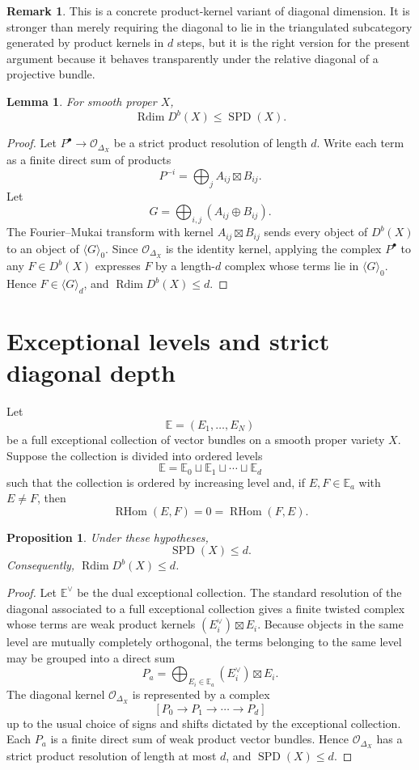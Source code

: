 \documentclass[11pt]{amsart}
\numberwithin{equation}{section}
\newtheorem{proposition}[theorem]{Proposition}
\newtheorem{lemma}[theorem]{Lemma}
\theoremstyle{definition}
\newtheorem{remark}[theorem]{Remark}
\DeclareMathOperator{\Rdim}{Rdim}
\DeclareMathOperator{\RHom}{RHom}
\DeclareMathOperator{\SPD}{SPD}
\begin{document}
\begin{remark}
This is a concrete product-kernel variant of diagonal dimension. It is stronger than merely requiring the diagonal to lie in the triangulated subcategory generated by product kernels in $d$ steps, but it is the right version for the present argument because it behaves transparently under the relative diagonal of a projective bundle.
\end{remark}

\begin{lemma}
For smooth proper $X$,
\[
\Rdim D^b(X)\le \SPD(X).
\]
\end{lemma}

\begin{proof}
Let $P^\bullet\to \mathcal O_{\Delta_X}$ be a strict product resolution of length $d$. Write each term as a finite direct sum of products
\[
P^{-i}=\bigoplus_j A_{ij}\boxtimes B_{ij}.
\]
Let
\[
G=\bigoplus_{i,j}(A_{ij}\oplus B_{ij}).
\]
The Fourier--Mukai transform with kernel $A_{ij}\boxtimes B_{ij}$ sends every object of $D^b(X)$ to an object of $\langle G\rangle_0$. Since $\mathcal O_{\Delta_X}$ is the identity kernel, applying the complex $P^\bullet$ to any $F\in D^b(X)$ expresses $F$ by a length-$d$ complex whose terms lie in $\langle G\rangle_0$. Hence $F\in\langle G\rangle_d$, and $\Rdim D^b(X)\le d$.
\end{proof}

\section{Exceptional levels and strict diagonal depth}

Let
\[
\mathbb E=(E_1,\dots,E_N)
\]
be a full exceptional collection of vector bundles on a smooth proper variety $X$. Suppose the collection is divided into ordered levels
\[
\mathbb E=\mathbb E_0\sqcup\mathbb E_1\sqcup\cdots\sqcup\mathbb E_d
\]
such that the collection is ordered by increasing level and, if $E,F\in\mathbb E_a$ with $E\ne F$, then
\[
\RHom(E,F)=0=\RHom(F,E).
\]

\begin{proposition}
Under these hypotheses,
\[
\SPD(X)\le d.
\]
Consequently, $\Rdim D^b(X)\le d$.
\end{proposition}

\begin{proof}
Let $\mathbb E^\vee$ be the dual exceptional collection. The standard resolution of the diagonal associated to a full exceptional collection gives a finite twisted complex whose terms are weak product kernels $(E_i^\vee)\boxtimes E_i$. Because objects in the same level are mutually completely orthogonal, the terms belonging to the same level may be grouped into a direct sum
\[
P_a=\bigoplus_{E_i\in\mathbb E_a}(E_i^\vee)\boxtimes E_i.
\]
The diagonal kernel $\mathcal O_{\Delta_X}$ is represented by a complex
\[
\left[
P_0\to P_1\to\cdots\to P_d
\right]
\]
up to the usual choice of signs and shifts dictated by the exceptional collection. Each $P_a$ is a finite direct sum of weak product vector bundles. Hence $\mathcal O_{\Delta_X}$ has a strict product resolution of length at most $d$, and $\SPD(X)\le d$.
\end{proof}
\end{document}
